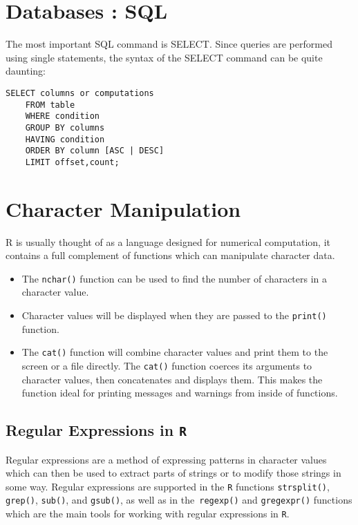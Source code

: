 \documentclass[12pt]{article} %
\begin{document}
\section{Databases : SQL}
The most important SQL command is
SELECT. Since queries are performed using single statements, the syntax of
the SELECT command can be quite daunting:
\begin{framed}
\begin{verbatim}
SELECT columns or computations
	FROM table
	WHERE condition
	GROUP BY columns
	HAVING condition
	ORDER BY column [ASC | DESC]
	LIMIT offset,count;
\end{verbatim}
\end{framed}
\section{Character Manipulation}
R is usually thought of as a language designed for numerical computation,
it contains a full complement of functions which can manipulate character
data.

\begin{itemize}
\item The \texttt{nchar()} function can be used to find the number of characters in a character value.
\item Character values will be displayed when they are passed to the  \texttt{print()} function.
\item The \texttt{cat()}  function will combine
character values and print them to the screen or a file directly. The \texttt{cat()}
function coerces its arguments to character values, then concatenates and displays
them. This makes the function ideal for printing messages and warnings
from inside of functions.
\end{itemize}

\subsection{Regular Expressions in \texttt{R}}
Regular expressions are a method of expressing patterns in character values
which can then be used to extract parts of strings or to modify those strings in some way. Regular expressions are supported in the \texttt{R} functions \texttt{strsplit()},
\texttt{grep()}, \texttt{sub()}, and \texttt{gsub()}, as well as in the\texttt{ regexp()} and \texttt{gregexpr()} functions which
are the main tools for working with regular expressions in \texttt{R}.
\end{document}
